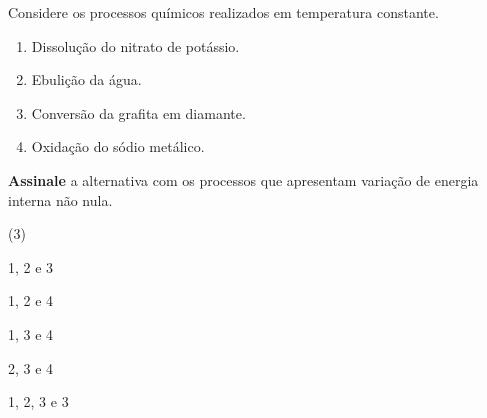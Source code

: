 \documentclass[braun, twocolumn]{braun}
\begin{document}
\begin{problem}
[2A08]Considere os processos químicos realizados em temperatura constante.

\begin{enumerate}
\def\labelenumi{\arabic{enumi}.}

\item
  Dissolução do nitrato de potássio.
\item
  Ebulição da água.
\item
  Conversão da grafita em diamante.
\item
  Oxidação do sódio metálico.
\end{enumerate}

\textbf{Assinale} a alternativa com os processos que apresentam variação
de energia interna não nula.


\begin{choices}
(3)
\item 1, 2 e 3

\item 1, 2 e 4

\item 1, 3 e 4

\item 2, 3 e 4

\item 1, 2, 3 e 3

\end{choices}

\end{problem}
\end{document}
